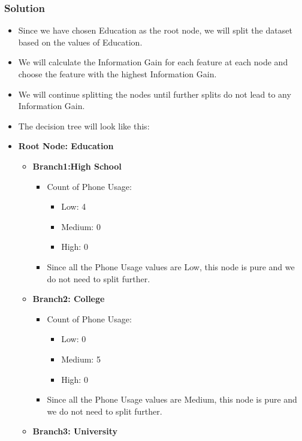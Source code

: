 \documentclass{article}
\begin{document}
\begin{enumerate}[label=\alph*)]
\subsubsection*{Solution}
\begin{itemize}
   \item Since we have chosen Education as the root node, we will split the dataset based on the values of Education.
   \item We will calculate the Information Gain for each feature at each node and choose the feature with the highest Information Gain.
   \item We will continue splitting the nodes until further splits do not lead to any Information Gain.
   \item The decision tree will look like this:
   \item \textbf{Root Node: Education}
   \begin{itemize}
      \item \textbf{Branch1:High School}
      \begin{itemize}
         \item Count of Phone Usage:
         \begin{itemize}
            \item Low: 4
            \item Medium: 0
            \item High: 0
         \end{itemize}
         \item Since all the Phone Usage values are Low, this node is pure and we do not need to split further.
      \end{itemize}
      \item \textbf{Branch2: College}
      \begin{itemize}
         \item Count of Phone Usage:
         \begin{itemize}
            \item Low: 0
            \item Medium: 5
            \item High: 0
         \end{itemize}
         \item Since all the Phone Usage values are Medium, this node is pure and we do not need to split further.
         \end{itemize}
      \item \textbf{Branch3: University}
      \begin{itemize}

\end{itemize}
\end{itemize}
\end{itemize}
\end{enumerate}
\end{document}
